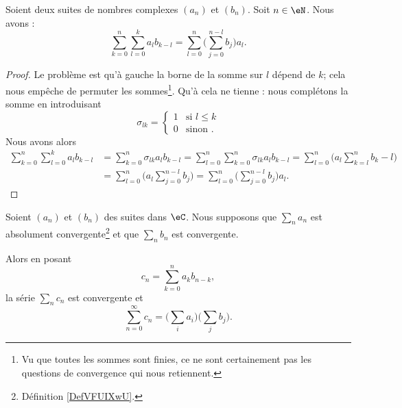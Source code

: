 \begin{lemma}       \label{LEMooNYAXooKUuQFe}
    Soient deux suites de nombres complexes \( (a_n)\) et \( (b_n)\). Soit \( n\in \eN\). Nous avons :
    \begin{equation}
        \sum_{k=0}^n\sum_{l=0}^ka_lb_{k-l}=\sum_{l=0}^n\big( \sum_{j=0}^{n-l}b_j \big)a_l.
    \end{equation}
\end{lemma}

\begin{proof}
    Le problème est qu'à gauche la borne de la somme sur \( l\) dépend de \( k\); cela nous empêche de permuter les sommes\footnote{Vu que toutes les sommes sont finies, ce ne sont certainement pas les questions de convergence qui nous retiennent.}. Qu'à cela ne tienne : nous complétons la somme en introduisant
    \begin{equation}
         \sigma_{lk}=\begin{cases}
            1    &   \text{si } l\leq k\\
            0    &    \text{sinon }.
        \end{cases}
    \end{equation}
    Nous avons alors
    \begin{subequations}
        \begin{align}
            \sum_{k=0}^n\sum_{l=0}^ka_lb_{k-l}&=\sum_{k=0}^n\sigma_{lk}a_lb_{k-l}=\sum_{l=0}^n\sum_{k=0}^n\sigma_{lk}a_lb_{k-l} =\sum_{l=0}^n\big( a_l\sum_{k=l}^nb_k-l \big)\\
            &=\sum_{l=0}^n\big( a_l\sum_{j=0}^{n-l}b_j \big)=\sum_{l=0}^n\big( \sum_{j=0}^{n-l}b_j \big)a_l.
        \end{align}
    \end{subequations}
\end{proof}

\begin{proposition}       \label{PROPooPKGEooZKyxwo}
    Soient \( (a_n)\) et \( (b_n)\) des suites dans \( \eC\). Nous supposons que \( \sum_na_n\) est absolument convergente\footnote{Définition \ref{DefVFUIXwU}.} et que \( \sum_nb_n\) est convergente.

    Alors en posant
    \begin{equation}
        c_n=\sum_{k=0}^na_kb_{n-k},
    \end{equation}
    la série \( \sum_nc_n\) est convergente et
    \begin{equation}
        \sum_{n=0}^{\infty}c_n=\big( \sum_ia_i \big)\big( \sum_j b_j \big).
    \end{equation}
\end{proposition}

